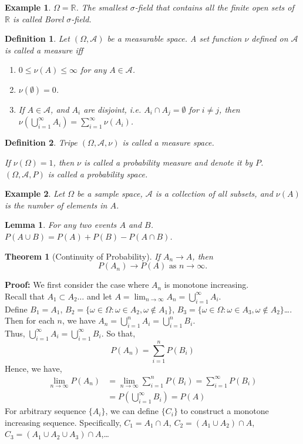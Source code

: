 \documentclass[11pt]{article}
\def\MA{{\mathcal A}}
\def\BR{{\mathbb R}}
\newtheorem{theorem}{Theorem}[section]
\newtheorem{lemma}{Lemma}[section]
\newtheorem{definition}{Definition}[section]
\newtheorem{example}{Example}[section]
\begin{document}
\begin{example}
$\Omega = \BR$. The smallest $\sigma$-field that contains all the finite open sets of $\BR$  is called Borel $\sigma$-field.
\end{example}

\begin{definition}
Let $(\Omega, \MA)$ be a measurable space. A set function $\nu$ defined on $\MA$ is called a measure iff
\begin{enumerate}
\item $0 \leq \nu(A) \leq \infty$ for any $A \in \MA$.
\item $\nu(\emptyset) = 0$.
\item If $A \in \MA$, and $A_i$ are disjoint, i.e. $A_i \cap A_j = \emptyset$ for $i \neq j$,
then $\nu(\bigcup_{i=1}^\infty A_i) = \sum_{i=1}^\infty \nu(A_i)$.
\end{enumerate}
\end{definition}

\begin{definition}
Tripe $(\Omega, \MA, \nu)$ is called a measure space.

If $\nu(\Omega) = 1$, then $\nu$ is called a probability measure and denote it by $P$.
$(\Omega, \MA, P)$ is called a probability space.
\end{definition}

\begin{example}
Let $\Omega$ be a sample space, $\MA$ is a collection of all subsets, and $\nu(A)$ is the number of elements in $A$.
\end{example}

\begin{lemma}
For any two events $A$ and $B$. $P(A \cup B) = P(A) + P(B) - P(A \cap B)$.
\end{lemma}

\begin{theorem}[Continuity of Probability]
If $A_n \rightarrow A$, then
\[ P(A_n) \rightarrow P(A) \text{ as } n\rightarrow \infty. \]
\end{theorem}
{\bf Proof: } We first consider the case where $A_n$ is monotone increasing.\\
Recall that $A_1\subset A_2\dots$ and let $A = \lim_{n\rightarrow \infty}A_n = \bigcup_{i = 1}^{\infty}A_i$.\\
Define $B_1 = A_1$, $B_2 = \{ \omega \in \Omega : \omega \in A_2, \omega \notin A_1\}$,
$B_3 = \{ \omega \in \Omega : \omega \in A_3, \omega \notin A_2\}$\dots.
Then for each $n$, we have $A_n = \bigcup_{i=1}^{n}A_i = \bigcup_{i=1}^{n}B_i$.\\
Thus, $\bigcup_{i=1}^{\infty}A_i = \bigcup_{i=1}^{\infty}B_i$. So that,
\[P(A_n) = \sum_{i=1}^n P(B_i)\]
Hence, we have,
\begin{align}\nonumber
\lim_{n\rightarrow\infty}P(A_n) & = \lim_{n\rightarrow\infty}\sum_{i=1}^n P(B_i) = \sum_{i=1}^{\infty}P(B_i)\\
& = P(\bigcup_{i=1}^{\infty}B_i) = P(A)\nonumber
\end{align}
For arbitrary sequence $\{A_i\}$, we can define $\{C_i\}$ to construct a monotone increasing sequence.
Specifically,
$C_1 = A_1 \cap A$,
$C_2 = (A_1 \cup A_2) \cap A$,
$C_3 = (A_1 \cup A_2 \cup A_3) \cap A$,\dots
\end{document}
